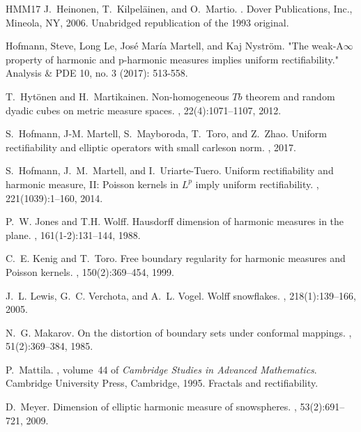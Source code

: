 \documentclass{article}
\theoremstyle{plain}
\theoremstyle{plain}
\theoremstyle{definition}
\theoremstyle{plain}
\begin{document}
\begin{thebibliography}{HMM{\etalchar{+}}17}
J.~Heinonen, T.~Kilpel{\"a}inen, and O.~Martio.
.
\newblock Dover Publications, Inc., Mineola, NY, 2006.
\newblock Unabridged republication of the 1993 original.

 Hofmann, Steve, Long Le, José María Martell, and Kaj Nyström. "The weak-A$\infty$ property of harmonic and p-harmonic measures implies uniform rectifiability." Analysis \& PDE 10, no. 3 (2017): 513-558.

T.~Hyt{\"o}nen and H.~Martikainen.
\newblock Non-homogeneous {$Tb$} theorem and random dyadic cubes on metric
  measure spaces.
, 22(4):1071--1107, 2012.

S.~Hofmann, J-M. Martell, S.~Mayboroda, T.~Toro, and Z.~Zhao.
\newblock Uniform rectifiability and elliptic operators with small carleson
  norm.
, 2017.

S.~Hofmann, J.~M.~Martell, and I.~Uriarte-Tuero.
\newblock Uniform rectifiability and harmonic measure, {II}: {P}oisson kernels in $L^p$ imply uniform rectifiability.
, 221(1039):1--160, 2014.


P.~W. Jones and T.H. Wolff.
\newblock Hausdorff dimension of harmonic measures in the plane.
, 161(1-2):131--144, 1988.

C.~E. Kenig and T.~Toro.
\newblock Free boundary regularity for harmonic measures and {P}oisson kernels.
, 150(2):369--454, 1999.

J.~L. Lewis, G.~C. Verchota, and A.~L. Vogel.
\newblock Wolff snowflakes.
, 218(1):139--166, 2005.

N.~G. Makarov.
\newblock On the distortion of boundary sets under conformal mappings.
, 51(2):369--384, 1985.

P.~Mattila.
, volume~44
  of {\em Cambridge Studies in Advanced Mathematics}.
\newblock Cambridge University Press, Cambridge, 1995.
\newblock Fractals and rectifiability.

D.~Meyer.
\newblock Dimension of elliptic harmonic measure of snowspheres.
, 53(2):691--721, 2009.


\end{thebibliography}
\end{document}
